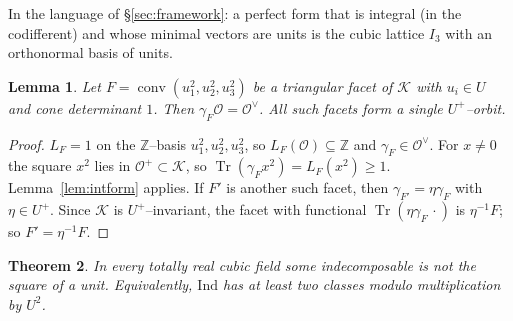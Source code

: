 \documentclass[11pt,reqno]{amsart}
\theoremstyle{plain}
\newtheorem{theorem}{Theorem}[section]
\newtheorem{lemma}[theorem]{Lemma}
\theoremstyle{definition}
\newcommand{\Z}{\mathbb{Z}}
\newcommand{\Tr}{\operatorname{Tr}}
\newcommand{\conv}{\operatorname{conv}}
\begin{document}
In the language of \S\ref{sec:framework}: a perfect form that is integral (in the codifferent) and whose minimal
vectors are units is the cubic lattice $I_3$ with an orthonormal basis of units.

\begin{lemma}\label{lem:unitfacet}
Let $F=\conv(u_1^2,u_2^2,u_3^2)$ be a triangular facet of $\mathcal K$ with $u_i\in U$ and cone determinant $1$. Then
$\gamma_F\mathcal O=\mathcal O^\vee$. All such facets form a single $U^+$--orbit.
\end{lemma}

\begin{proof}
$L_F=1$ on the $\Z$--basis $u_1^2,u_2^2,u_3^2$, so $L_F(\mathcal O)\subseteq\Z$ and $\gamma_F\in\mathcal O^\vee$. For
$x\ne0$ the square $x^2$ lies in $\mathcal O^+\subset\mathcal K$, so $\Tr(\gamma_Fx^2)=L_F(x^2)\ge1$. Lemma~\ref{lem:intform}
applies. If $F'$ is another such facet, then $\gamma_{F'}=\eta\gamma_F$ with $\eta\in U^+$. Since $\mathcal K$ is
$U^+$--invariant, the facet with functional $\Tr(\eta\gamma_F\,\cdot)$ is $\eta^{-1}F$; so $F'=\eta^{-1}F$.
\end{proof}

\begin{theorem}\label{thm:onesquare}
In every totally real cubic field some indecomposable is not the square of a unit. Equivalently,
$\mathrm{Ind}$ has at least two classes modulo multiplication by $U^2$.
\end{theorem}
\end{document}
